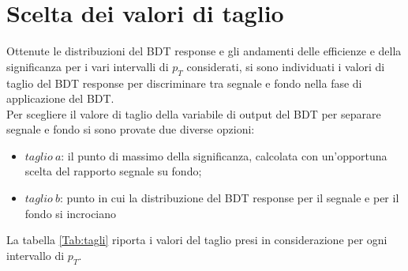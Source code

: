  
 




\section{Scelta dei valori di taglio}

Ottenute le distribuzioni del BDT response e gli andamenti delle efficienze e della significanza per i vari intervalli di $p_T$ considerati, si sono individuati i valori di taglio del BDT response per  discriminare tra segnale e fondo nella fase di applicazione del BDT. 
\\Per scegliere il valore di taglio della variabile di output del BDT per separare segnale e fondo si sono provate due diverse opzioni:
    \begin{itemize}
    \item $taglio \ a$: il punto di massimo della significanza, calcolata con un'opportuna scelta del rapporto segnale su fondo;
    \item $taglio \ b$: punto in cui la distribuzione del BDT response per il segnale e per il fondo si incrociano %
    \end{itemize}
La tabella \ref{Tab:tagli} riporta i valori del taglio presi in considerazione per ogni intervallo di $p_T$.


